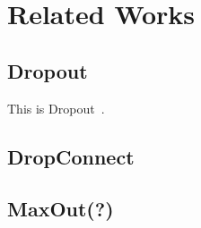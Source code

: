 \section{Related Works}
\label{sec:related}

\subsection{Dropout}

This is Dropout~\cite{srivastava2013improving}.

\subsection{DropConnect}

\subsection{MaxOut(?)}

